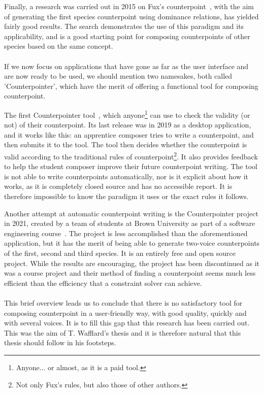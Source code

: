 Finally, a research was carried out in 2015 on Fux's counterpoint~\cite{komosinski2015automatic}, with the aim of generating the first species counterpoint using dominance relations, has yielded fairly good results. The search demonstrates the use of this paradigm and its applicability, and is a good starting point for composing counterpoints of other species based on the same concept.

\paragraph{}
If we now focus on applications that have gone as far as the user interface and are now ready to be used, we should mention two namesakes, both called 'Counterpointer', which have the merit of offering a functional tool for composing counterpoint.

The first Counterpointer tool~\cite{counterpointer_ms}, which anyone\footnote{Anyone... or almost, as it is a paid tool.} can use to check the validity (or not) of their counterpoint. Its last release was in 2019 as a desktop application, and it works like this: an apprentice composer tries to write a counterpoint, and then submits it to the tool. The tool then decides whether the counterpoint is valid according to the traditional rules of counterpoint\footnote{Not only Fux's rules, but also those of other authors.}. It also provides feedback to help the student composer improve their future counterpoint writing. The tool is not able to write counterpoints automatically, nor is it explicit about how it works, as it is completely closed source and has no accessible report. It is therefore impossible to know the paradigm it uses or the exact rules it follows.

Another attempt at automatic counterpoint writing is the Counterpointer project in 2021, created by a team of students at Brown University as part of a software engineering course~\cite{counterpointer_project}. The project is less accomplished than the aforementioned application, but it has the merit of being able to generate two-voice counterpoints of the first, second and third species. It is an entirely free and open source project. While the results are encouraging, the project has been discontinued as it was a course project and their method of finding a counterpoint seems much less efficient than the efficiency that a constraint solver can achieve. 


\paragraph{}
This brief overview leads us to conclude that there is no satisfactory tool for composing counterpoint in a user-friendly way, with good quality, quickly and with several voices. It is to fill this gap that this research has been carried out. This was the aim of T. Wafflard's thesis and it is therefore natural that this thesis should follow in his footsteps.



